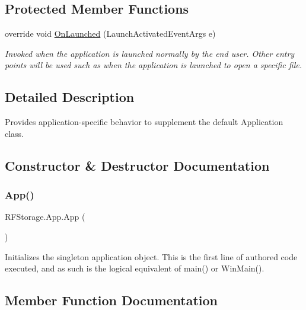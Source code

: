 \subsection*{Protected Member Functions}
\begin{DoxyCompactItemize}
\item 
override void \mbox{\hyperlink{class_r_f_storage_1_1_app_afedc9ebee076fe52dd25f1b5d186dc1c}{On\+Launched}} (Launch\+Activated\+Event\+Args e)
\begin{DoxyCompactList}\small\item\em Invoked when the application is launched normally by the end user. Other entry points will be used such as when the application is launched to open a specific file. \end{DoxyCompactList}\end{DoxyCompactItemize}


\subsection{Detailed Description}
Provides application-\/specific behavior to supplement the default Application class. 



\subsection{Constructor \& Destructor Documentation}
\mbox{\label{class_r_f_storage_1_1_app_a69692c21260af99112f45c3471da8370}} 
\subsubsection{\texorpdfstring{App()}{App()}}
{\footnotesize\ttfamily R\+F\+Storage.\+App.\+App (\begin{DoxyParamCaption}{ }\end{DoxyParamCaption})}



Initializes the singleton application object. This is the first line of authored code executed, and as such is the logical equivalent of main() or Win\+Main(). 



\subsection{Member Function Documentation}
\mbox{\label{class_r_f_storage_1_1_app_ad5b51fc1d1b2ccdbd2ea4da96fbe76d2}} 
